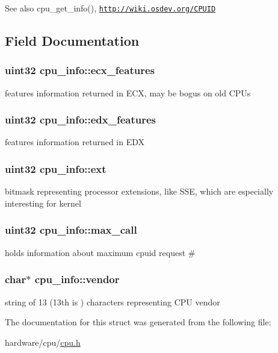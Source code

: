 \begin{DoxySeeAlso}{See also}
cpu\_\-get\_\-info(), \href{http://wiki.osdev.org/CPUID}{\tt http://wiki.osdev.org/CPUID} 
\end{DoxySeeAlso}


\subsection{Field Documentation}
\hypertarget{structcpu__info_a408fc5b4c8d16fc97807d1604d5dfbb8}{
\subsubsection[{ecx\_\-features}]{\setlength{\rightskip}{0pt plus 5cm}uint32 {\bf cpu\_\-info::ecx\_\-features}}}
\label{structcpu__info_a408fc5b4c8d16fc97807d1604d5dfbb8}
features information returned in ECX, may be bogus on old CPUs \hypertarget{structcpu__info_a3b64d4cb33224305ebe2f5f0613ed779}{
\subsubsection[{edx\_\-features}]{\setlength{\rightskip}{0pt plus 5cm}uint32 {\bf cpu\_\-info::edx\_\-features}}}
\label{structcpu__info_a3b64d4cb33224305ebe2f5f0613ed779}
features information returned in EDX \hypertarget{structcpu__info_a9476d29ea3c764482313d41dd36a90e4}{
\subsubsection[{ext}]{\setlength{\rightskip}{0pt plus 5cm}uint32 {\bf cpu\_\-info::ext}}}
\label{structcpu__info_a9476d29ea3c764482313d41dd36a90e4}
bitmask representing processor extensions, like SSE, which are especially interesting for kernel \hypertarget{structcpu__info_a8919ce198e487044c8e49ea7ccabf031}{
\subsubsection[{max\_\-call}]{\setlength{\rightskip}{0pt plus 5cm}uint32 {\bf cpu\_\-info::max\_\-call}}}
\label{structcpu__info_a8919ce198e487044c8e49ea7ccabf031}
holds information about maximum cpuid request \# \hypertarget{structcpu__info_a4f59bf448826ce3928390aef9e91b069}{
\subsubsection[{vendor}]{\setlength{\rightskip}{0pt plus 5cm}char$\ast$ {\bf cpu\_\-info::vendor}}}
\label{structcpu__info_a4f59bf448826ce3928390aef9e91b069}
string of 13 (13th is ) characters representing CPU vendor 

The documentation for this struct was generated from the following file:\begin{DoxyCompactItemize}
\item 
hardware/cpu/\hyperlink{cpu_8h}{cpu.h}\end{DoxyCompactItemize}
